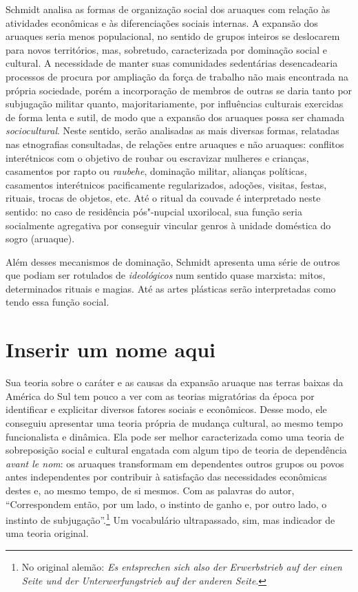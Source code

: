 Schmidt analisa as formas de organização social dos aruaques com relação às atividades econômicas e às diferenciações sociais internas. A expansão dos aruaques seria menos populacional, no sentido de grupos inteiros se deslocarem para novos territórios, mas, sobretudo, caracterizada por dominação social e cultural. A necessidade de manter suas comunidades sedentárias desencadearia processos de procura por ampliação da força de trabalho não mais encontrada na própria sociedade, porém a incorporação de membros de outras se daria tanto por subjugação militar quanto, majoritariamente, por influências culturais exercidas de forma lenta e sutil, de modo que a expansão dos aruaques possa ser chamada \textit{sociocultural}. Neste sentido, serão analisadas as mais diversas formas, relatadas nas etnografias consultadas, de relações entre aruaques e não aruaques: conflitos interétnicos com o objetivo de roubar ou escravizar mulheres e crianças, casamentos por rapto ou \textit{raubehe}, dominação militar, alianças políticas, casamentos interétnicos pacificamente regularizados, adoções, visitas, festas, rituais, trocas de objetos, etc. Até o ritual da couvade é interpretado neste sentido: no caso de residência pós"-nupcial uxorilocal, sua função seria socialmente agregativa por conseguir vincular genros à unidade doméstica do sogro (aruaque).

Além desses mecanismos de dominação, Schmidt apresenta uma série de
outros que podiam ser rotulados de \textit{ideológicos} num sentido quase
marxista: mitos, determinados rituais e magias. Até as artes plásticas
serão interpretadas como tendo essa função social.

\section{Inserir um nome aqui}

Sua teoria sobre o caráter e as causas da expansão aruaque nas
terras baixas da América do Sul tem pouco a ver com as teorias
migratórias da época por identificar e explicitar diversos fatores
sociais e econômicos. Desse modo, ele conseguiu apresentar uma teoria
própria de mudança cultural, ao mesmo tempo funcionalista e dinâmica.
Ela pode ser melhor caracterizada como uma teoria de sobreposição
social e cultural engatada com algum tipo de teoria de dependência
\textit{avant le nom}: os aruaques transformam em dependentes outros
grupos ou povos antes independentes por contribuir à satisfação das
necessidades econômicas destes e, ao mesmo tempo, de si mesmos. Com
as palavras do autor, ``Correspondem então, por um lado, o instinto de
ganho e, por outro lado, o instinto de subjugação''.\footnote{No original alemão: \textit{Es entsprechen sich also der Erwerbstrieb auf der einen Seite und der
Unterwerfungstrieb auf der anderen Seite}.} Um vocabulário
ultrapassado, sim, mas indicador de uma teoria original.

